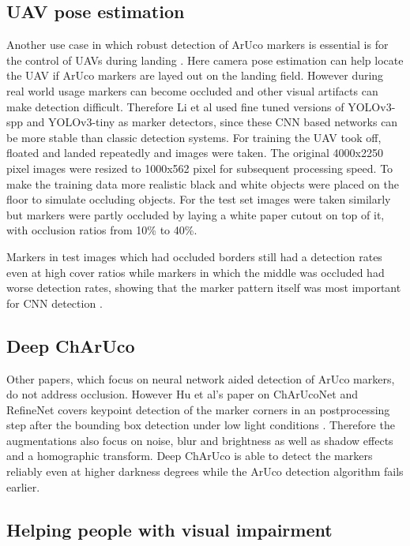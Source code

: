\documentclass[10pt]{book}
\begin{document}
\subsection{UAV pose estimation}

Another use case in which robust detection of \ac{ArUco} markers is essential is for the control of \acp{UAV} during landing \cite{li2020aruco}. Here camera pose estimation can help locate the \ac{UAV} if \ac{ArUco} markers are layed out on the landing field. However during real world usage markers can become occluded and other visual artifacts can make detection difficult. Therefore Li et al used fine tuned versions of \ac{YOLO}v3-spp and \ac{YOLO}v3-tiny as marker detectors, since these \ac{CNN} based networks can be more stable than classic detection systems. For training the \ac{UAV} took off, floated and landed repeatedly and images were taken. The original 4000x2250 pixel images were resized to 1000x562 pixel for subsequent processing speed. To make the training data more realistic black and white objects were placed on the floor to simulate occluding objects. For the test set images were taken similarly but markers were partly occluded by laying a white paper cutout on top of it, with occlusion ratios from 10\% to 40\%. 

Markers in test images which had occluded borders still had a detection rates even at high cover ratios while markers in which the middle was occluded had worse detection rates, showing that the marker pattern itself was most important for \ac{CNN} detection \cite{li2020aruco}.

\subsection{Deep ChArUco}

Other papers, which focus on neural network aided detection of \ac{ArUco} markers, do not address occlusion. However Hu et al's paper on ChArUcoNet and RefineNet covers keypoint detection of the marker corners in an postprocessing step after the bounding box detection under low light conditions \cite{hu2019deep}. Therefore the augmentations also focus on noise, blur and brightness as well as shadow effects and a homographic transform. Deep ChArUco is able to detect the markers reliably even at higher darkness degrees while the \ac{ArUco} detection algorithm fails earlier. 

\subsection{Helping people with visual impairment}
\end{document}

